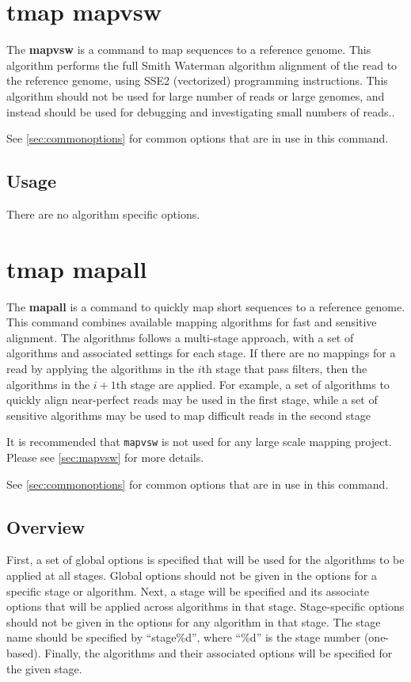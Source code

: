 \documentclass[a4paper,12pt]{book}
\newcommand{\TT}[1]{{\tt #1}} %
\newcommand{\BF}[1]{{\bf #1}} %
\begin{document}
\section{tmap mapvsw}
\label{sec:mapvsw}
The \BF{mapvsw} is a command to map sequences to a reference genome.
This algorithm performs the full Smith Waterman algorithm alignment of the read to the reference genome, using SSE2 (vectorized) programming instructions.
This algorithm should not be used for large number of reads or large genomes, and instead should be used for debugging and investigating small numbers of reads..

See \autoref{sec:commonoptions} for common options that are in use in this command.

\subsection{Usage}
There are no algorithm specific options.

\section{tmap mapall}
\label{sec:mapall}
The \BF{mapall} is a command to quickly map short sequences to a reference genome.
This command combines available mapping algorithms for fast and sensitive alignment.
The algorithms follows a multi-stage approach, with a set of algorithms and associated settings for each stage.
If there are no mappings for a read by applying the algorithms in the $i$th stage that pass filters, then the algorithms in the $i+1$th stage are applied. 
For example, a set of algorithms to quickly align near-perfect reads may be used in the first stage, while a set of sensitive algorithms may be used to map difficult reads in the second stage

It is recommended that \TT{mapvsw} is not used for any large scale mapping project.  
Please see \autoref{sec:mapvsw} for more details.

See \autoref{sec:commonoptions} for common options that are in use in this command.

\subsection{Overview}
First, a set of global options is specified that will be used for the algorithms to be applied at all stages.
Global options should not be given in the options for a specific stage or algorithm.
Next, a stage will be specified and its associate options that will be applied across algorithms in that stage.
Stage-specific options should not be given in the options for any algorithm in that stage.
The stage name should be specified by ``stage\%d'', where ``\%d'' is the stage number (one-based).
Finally, the algorithms and their associated options will be specified for the given stage.
\end{document}
